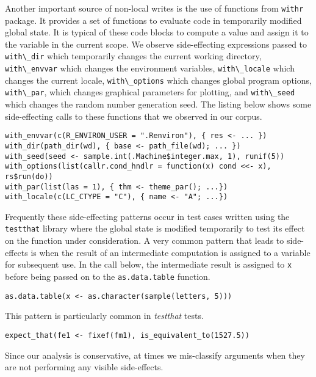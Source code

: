 \documentclass[review,nonacm,screen,acmsmall,anonymous=true]{acmart}
\newcommand{\code}[1]{\lstinline |#1|\xspace}
\begin{document}
Another important source of non-local writes is the use of functions from
\code{withr} package. It provides a set of functions to evaluate code in
temporarily modified global state. It is typical of these code blocks to compute
a value and assign it to the variable in the current scope. We observe
side-effecting expressions passed to \code{with\_dir} which temporarily changes
the current working directory, \code{with\_envvar} which changes the environment
variables, \code{with\_locale} which changes the current locale,
\code{with\_options} which changes global program options, \code{with\_par},
which changes graphical parameters for plotting, and \code{with\_seed} which
changes the random number generation seed. The listing below shows some
side-effecting calls to these functions that we observed in our corpus.
%
\begin{lstlisting}
with_envvar(c(R_ENVIRON_USER = ".Renviron"), { res <- ... })
with_dir(path_dir(wd), { base <- path_file(wd); ... })
with_seed(seed <- sample.int(.Machine$integer.max, 1), runif(5))
with_options(list(callr.cond_hndlr = function(x) cond <<- x), rs$run(do))
with_par(list(las = 1), { thm <- theme_par(); ...})
with_locale(c(LC_CTYPE = "C"), { name <- "A"; ...})
\end{lstlisting}
%
Frequently these side-effecting patterns occur in test cases written using the
\code{testthat} library where the global state is modified temporarily to test
its effect on the function under consideration.
%
A very common pattern that leads to side-effects is when the result of an
intermediate computation is assigned to a variable for subsequent use. In the
call below, the intermediate result is assigned to \code{x} before being passed
on to the \code{as.data.table} function.
%
\begin{lstlisting}
as.data.table(x <- as.character(sample(letters, 5)))
\end{lstlisting}
%
This pattern is particularly common in \emph{testthat} tests.
%
\begin{lstlisting}
expect_that(fe1 <- fixef(fm1), is_equivalent_to(1527.5))
\end{lstlisting}
%
Since our analysis is conservative, at times we mis-classify arguments when they
are not performing any visible side-effects.
\end{document}
